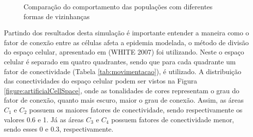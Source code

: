 \documentclass[a4paper,12pt]{article}
\begin{document}
\begin{figure}[!ht]
\centering
{}
\qquad
{}
\caption{Comparação do comportamento das populações com diferentes formas de vizinhanças}
\label{figure:exp1graph}
\end{figure}

Partindo dos resultados desta simulação é importante entender a maneira como o fator de conexão entre as células afeta a epidemia modelada, o método de divisão do espaço celular, apresentado em (WHITE 2007\cite{White2007}) foi utilizando. Neste o espaço celular é separado em quatro quadrantes, sendo que para cada quadrante um fator de conectividade (Tabela \ref{tab:movimentacao}), é utilizado. A distribuição das conectividades do espaço celular podem ser vistos na Figura \ref{figure:artificialCellSpace}, onde as tonalidades de cores representam o grau do fator de conexão, quanto mais escuro, maior o grau de conexão. Assim, as áreas $C_1$ e $C_2$ possuem os maiores fatores de conectividade, sendo respectivamente os valores 0.6 e 1. Já as áreas $C_3$ e $C_4$ possuem fatores de conectividade menor, sendo esses 0 e 0.3, respectivamente.
\end{document}
